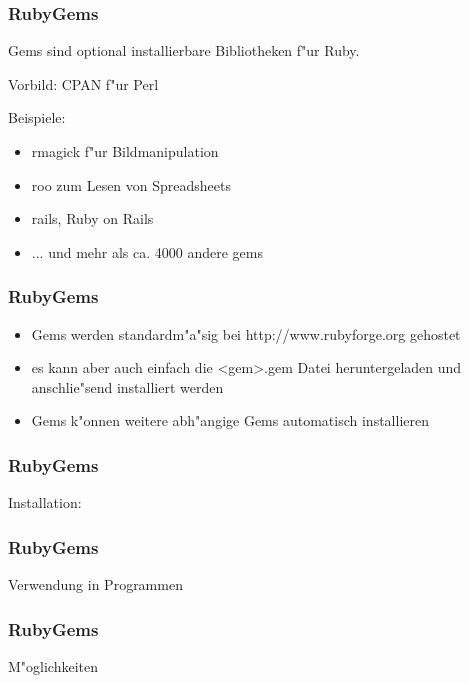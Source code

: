 \documentclass{beamer}
\begin{document}
\lstset{language=Ruby}
\lstset{basicstyle=\small,numbers=none, numberstyle=\tiny, numbersep=5pt}
\begin{frame}
  \frametitle{RubyGems}
  Gems sind optional installierbare Bibliotheken f"ur
  Ruby.
  
  Vorbild: CPAN f"ur Perl
 
  Beispiele:
  \begin{itemize}
    \item rmagick f"ur Bildmanipulation
    \item roo zum Lesen von Spreadsheets
    \item rails, Ruby on Rails
    \item ... und mehr als ca. 4000 andere gems
  \end{itemize}
\end{frame}

\begin{frame}
  \frametitle{RubyGems}
  \begin{itemize}
    \item Gems werden standardm"a"sig bei http://www.rubyforge.org gehostet
    \pause
    \item es kann aber auch einfach die <gem>.gem Datei heruntergeladen und anschlie"send installiert werden
    \pause
    \item Gems k"onnen weitere abh"angige Gems automatisch installieren
  \end{itemize} 
\end{frame}

\begin{frame}
  \frametitle{RubyGems}
  Installation:
  
\end{frame}

\begin{frame}
  \frametitle{RubyGems}
  Verwendung in Programmen
  
\end{frame}

\begin{frame}
  \frametitle{RubyGems}
  M"oglichkeiten
  
\end{frame}
\end{document}
